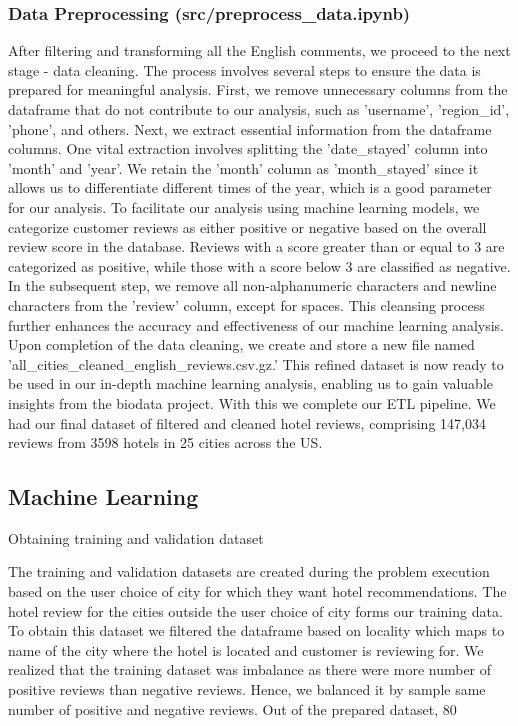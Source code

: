 \documentclass[conference]{IEEEtran}
\begin{document}
	\subsubsection{Data Preprocessing (src/preprocess\_data.ipynb)}
	After filtering and transforming all the English comments, we proceed to the next stage - data cleaning. The process involves several steps to ensure the data is prepared for meaningful analysis.
	First, we remove unnecessary columns from the dataframe that do not contribute to our analysis, such as 'username', 'region\_id', 'phone', and others. 
	Next, we extract essential information from the dataframe columns. One vital extraction involves splitting the 'date\_stayed' column into 'month' and 'year'. We retain the 'month' column as 'month\_stayed' since it allows us to differentiate different times of the year, which is a good parameter for our analysis.
	To facilitate our analysis using machine learning models, we categorize customer reviews as either positive or negative based on the overall review score in the database. Reviews with a score greater than or equal to 3 are categorized as positive, while those with a score below 3 are classified as negative.
	In the subsequent step, we remove all non-alphanumeric characters and newline characters from the 'review' column, except for spaces. This cleansing process further enhances the accuracy and effectiveness of our machine learning analysis.
	Upon completion of the data cleaning, we create and store a new file named 'all\_cities\_cleaned\_english\_reviews.csv.gz.' This refined dataset is now ready to be used in our in-depth machine learning analysis, enabling us to gain valuable insights from the biodata project.
	With this we complete our ETL pipeline. We had our final dataset of filtered and cleaned hotel reviews, comprising 147,034 reviews from 3598 hotels in 25 cities across the US.
	
	\subsection{Machine Learning}
	
	Obtaining training and validation dataset
	
	The training and validation datasets are created during the problem execution based on the user choice of city for which they want hotel recommendations. The hotel review for the cities outside the user choice of city forms our training data. To obtain this dataset we filtered the dataframe based on locality which maps to name of the city where the hotel is located and customer is reviewing for. We realized that the training dataset was imbalance as there were more number of positive reviews than negative reviews. Hence, we balanced it by sample same number of positive and negative reviews. Out of the prepared dataset, 80%
	
\end{document}
